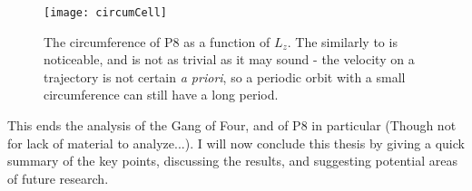 \begin{figure}[h!]
\texttt{[image: circumCell]}
\caption{The circumference of P8 as a function of $L_z$. The similarly to  is noticeable, and is not as trivial as it may sound - the velocity on a trajectory is not certain \emph{a priori}, so a periodic orbit with a small circumference can still have a long period.}\label{fig:circumCell}
\end{figure}

\clearpage 
This ends the analysis of the Gang of Four, and of P8 in particular (Though not for lack of material to analyze...). I will now conclude this thesis by giving a quick summary of the key points, discussing the results, and suggesting potential areas of future research. 